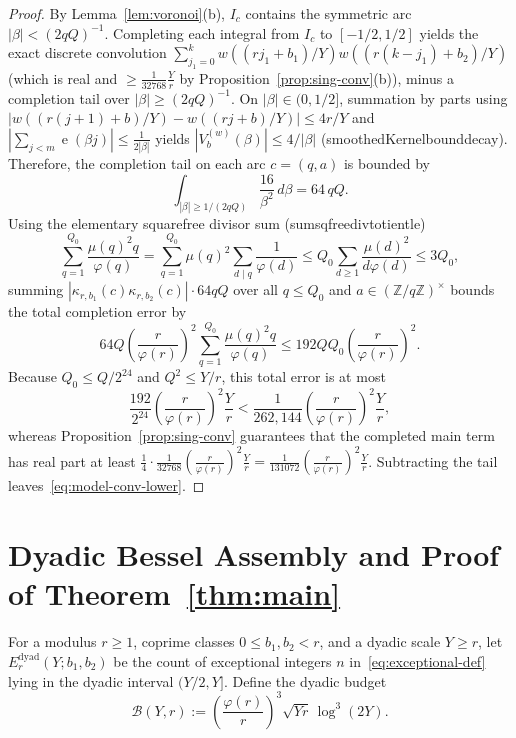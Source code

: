 \documentclass[11pt,reqno]{amsart}
\numberwithin{equation}{section}
\theoremstyle{definition}
\newcommand{\Z}{\mathbb{Z}}
\newcommand{\1}{\mathbf{1}}
\newcommand{\e}{\operatorname{e}}
\newcommand{\lean}[1]{{\footnotesize\ttfamily\renewcommand{\_}{\textunderscore\allowbreak}#1}}
\begin{document}
\begin{proof}
By Lemma~\ref{lem:voronoi}(b), $I_c$ contains the symmetric arc $|\beta| < (2qQ)^{-1}$. Completing each integral from $I_c$ to $[-1/2, 1/2]$ yields the exact discrete convolution $\sum_{j_1=0}^k w((rj_1+b_1)/Y)w((r(k-j_1)+b_2)/Y)$ (which is real and $\ge \frac{1}{32768}\frac{Y}{r}$ by Proposition~\ref{prop:sing-conv}(b)), minus a completion tail over $|\beta| \ge (2qQ)^{-1}$. On $|\beta| \in (0, 1/2]$, summation by parts using $|w((r(j+1)+b)/Y) - w((rj+b)/Y)| \le 4r/Y$ and $|\sum_{j < m} \e(\beta j)| \le \frac{1}{2|\beta|}$ yields $|V_b^{(w)}(\beta)| \le 4/|\beta|$ (\lean{smoothedKernel\_bound\_decay}). Therefore, the completion tail on each arc $c = (q, a)$ is bounded by
\[
  \int_{|\beta| \ge 1/(2qQ)} \frac{16}{\beta^2}\,d\beta = 64\, q Q.
\]
Using the elementary squarefree divisor sum (\lean{sum\_sqfree\_div\_totient\_le})
\[
  \sum_{q=1}^{Q_0} \frac{\mu(q)^2 q}{\varphi(q)}
  = \sum_{q=1}^{Q_0} \mu(q)^2 \sum_{d \mid q} \frac{1}{\varphi(d)}
  \le Q_0 \sum_{d \ge 1} \frac{\mu(d)^2}{d\varphi(d)}
  \le 3 Q_0,
\]
summing $|\kappa_{r,b_1}(c)\kappa_{r,b_2}(c)| \cdot 64 q Q$ over all $q \le Q_0$ and $a \in (\Z/q\Z)^\times$ bounds the total completion error by
\[
  64 Q \left(\frac{r}{\varphi(r)}\right)^2 \sum_{q=1}^{Q_0} \frac{\mu(q)^2 q}{\varphi(q)}
  \le 192 Q Q_0 \left(\frac{r}{\varphi(r)}\right)^2.
\] Because $Q_0 \le Q/2^{24}$ and $Q^2 \le Y/r$, this total error is at most
\[
  \frac{192}{2^{24}}\left(\frac{r}{\varphi(r)}\right)^2 \frac{Y}{r}
  < \frac{1}{262{,}144}\left(\frac{r}{\varphi(r)}\right)^2 \frac{Y}{r},
\]
whereas Proposition~\ref{prop:sing-conv} guarantees that the completed main term has real part at least $\frac{1}{4}\cdot\frac{1}{32768}\left(\frac{r}{\varphi(r)}\right)^2\frac{Y}{r} = \frac{1}{131072}\left(\frac{r}{\varphi(r)}\right)^2\frac{Y}{r}$. Subtracting the tail leaves~\eqref{eq:model-conv-lower}.
\end{proof}

\section{Dyadic Bessel Assembly and Proof of Theorem~\ref{thm:main}}
\label{sec:dyadic}

For a modulus $r \ge 1$, coprime classes $0 \le b_1, b_2 < r$, and a dyadic scale $Y \ge r$, let $E_r^{\mathrm{dyad}}(Y; b_1, b_2)$ be the count of exceptional integers $n$ in~\eqref{eq:exceptional-def} lying in the dyadic interval $(Y/2, Y]$. Define the dyadic budget
\begin{equation}\label{eq:dyadic-budget}
  \mathcal{B}(Y, r) := \left(\frac{\varphi(r)}{r}\right)^3 \sqrt{Y r}\,\log^3(2Y).
\end{equation}
\end{document}
